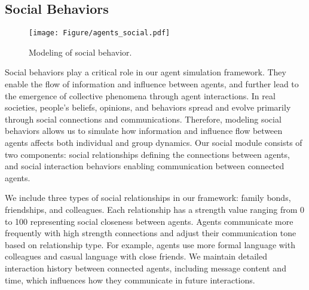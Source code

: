 

\subsection{Social Behaviors}\label{sec:social}
\begin{figure}[ht]
\centering
\texttt{[image: Figure/agents\_social.pdf]}
\caption{Modeling of social behavior.}
\label{fig:agents_social}
\end{figure}
Social behaviors play a critical role in our agent simulation framework. They enable the flow of information and influence between agents, and further lead to the emergence of collective phenomena through agent interactions. In real societies, people's beliefs, opinions, and behaviors spread and evolve primarily through social connections and communications. Therefore, modeling social behaviors allows us to simulate how information and influence flow between agents affects both individual and group dynamics. Our social module consists of two components: social relationships defining the connections between agents, and social interaction behaviors enabling communication between connected agents.

We include three types of social relationships in our framework: family bonds, friendships, and colleagues. Each relationship has a strength value ranging from 0 to 100 representing social closeness between agents. Agents communicate more frequently with high strength connections and adjust their communication tone based on relationship type. For example, agents use more formal language with colleagues and casual language with close friends. We maintain detailed interaction history between connected agents, including message content and time, which influences how they communicate in future interactions.


